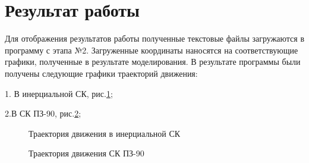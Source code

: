 \documentclass[]{article}
\begin{document}
\section{Результат работы}
Для отображения результатов работы полученные текстовые файлы загружаются в программу с этапа №2. Загруженные координаты наносятся на соответствующие графики, полученные в результате моделирования.
В результате программы были получены следующие графики траекторий движения:

1. В инерциальной СК, рис.\ref{inertz};

2.В СК ПЗ-90, рис.\ref{PZ};




\begin{figure}[h!]
	
	\caption{Траектория движения в инерциальной СК  }
	\label{inertz}
\end{figure}

\begin{figure}[h!]
	
	\caption{Траектория движения  СК ПЗ-90 }
	\label{PZ}
\end{figure}
\end{document}
